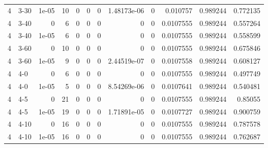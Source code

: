 \begin{tabular}{rlrrrrrrrrrr}
     4 & 3-30   &      1e-05 &          10 &                 0 &                 0 &     0           &     1.48173e-06 &      0           &        0.010757  &               0.989244 &           0.772135 \\
     4 & 3-40   &      0     &           6 &                 0 &                 0 &     0           &     0           &      0           &        0.0107555 &               0.989244 &           0.557264 \\
     4 & 3-40   &      1e-05 &           6 &                 0 &                 0 &     0           &     0           &      0           &        0.0107555 &               0.989244 &           0.558599 \\
     4 & 3-60   &      0     &          10 &                 0 &                 0 &     0           &     0           &      0           &        0.0107555 &               0.989244 &           0.675846 \\
     4 & 3-60   &      1e-05 &           9 &                 0 &                 0 &     0           &     2.44519e-07 &      0           &        0.0107558 &               0.989244 &           0.608127 \\
     4 & 4-0    &      0     &           6 &                 0 &                 0 &     0           &     0           &      0           &        0.0107555 &               0.989244 &           0.497749 \\
     4 & 4-0    &      1e-05 &           5 &                 0 &                 0 &     0           &     8.54269e-06 &      0           &        0.0107641 &               0.989244 &           0.540481 \\
     4 & 4-5    &      0     &          21 &                 0 &                 0 &     0           &     0           &      0           &        0.0107555 &               0.989244 &           0.85055  \\
     4 & 4-5    &      1e-05 &          19 &                 0 &                 0 &     0           &     1.71891e-05 &      0           &        0.0107727 &               0.989244 &           0.900759 \\
     4 & 4-10   &      0     &          16 &                 0 &                 0 &     0           &     0           &      0           &        0.0107555 &               0.989244 &           0.787578 \\
     4 & 4-10   &      1e-05 &          16 &                 0 &                 0 &     0           &     0           &      0           &        0.0107555 &               0.989244 &           0.762687 \\

\end{tabular}

